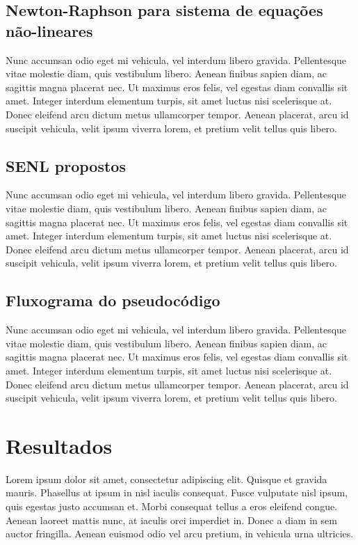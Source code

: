 \documentclass[a4paper, 12pt, openright, oneside]{article}
\begin{document}
\subsection{Newton-Raphson para sistema de equações não-lineares}
Nunc accumsan odio eget mi vehicula, vel interdum libero gravida. Pellentesque vitae molestie diam, quis vestibulum libero. Aenean finibus sapien diam, ac sagittis magna placerat nec. Ut maximus eros felis, vel egestas diam convallis sit amet. Integer interdum elementum turpis, sit amet luctus nisi scelerisque at. Donec eleifend arcu dictum metus ullamcorper tempor. Aenean placerat, arcu id suscipit vehicula, velit ipsum viverra lorem, et pretium velit tellus quis libero.

\subsection{SENL propostos}
Nunc accumsan odio eget mi vehicula, vel interdum libero gravida. Pellentesque vitae molestie diam, quis vestibulum libero. Aenean finibus sapien diam, ac sagittis magna placerat nec. Ut maximus eros felis, vel egestas diam convallis sit amet. Integer interdum elementum turpis, sit amet luctus nisi scelerisque at. Donec eleifend arcu dictum metus ullamcorper tempor. Aenean placerat, arcu id suscipit vehicula, velit ipsum viverra lorem, et pretium velit tellus quis libero.

\subsection{Fluxograma do pseudocódigo}
Nunc accumsan odio eget mi vehicula, vel interdum libero gravida. Pellentesque vitae molestie diam, quis vestibulum libero. Aenean finibus sapien diam, ac sagittis magna placerat nec. Ut maximus eros felis, vel egestas diam convallis sit amet. Integer interdum elementum turpis, sit amet luctus nisi scelerisque at. Donec eleifend arcu dictum metus ullamcorper tempor. Aenean placerat, arcu id suscipit vehicula, velit ipsum viverra lorem, et pretium velit tellus quis libero.

\newpage

\section{Resultados}

Lorem ipsum dolor sit amet, consectetur adipiscing elit. Quisque et gravida mauris. Phasellus at ipsum in nisl iaculis consequat. Fusce vulputate nisl ipsum, quis egestas justo accumsan et. Morbi consequat tellus a eros eleifend congue. Aenean laoreet mattis nunc, at iaculis orci imperdiet in. Donec a diam in sem auctor fringilla. Aenean euismod odio vel arcu pretium, in vehicula urna ultricies.
\end{document}

